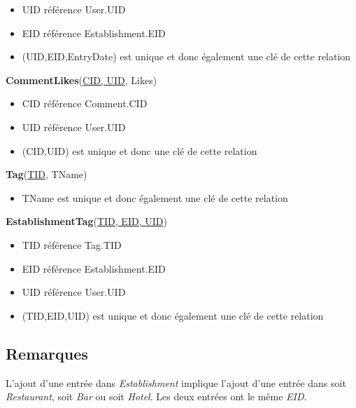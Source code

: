 \documentclass[11pt,a4paper]{report}
\begin{document}
\begin{itemize}
\item UID référence User.UID
\item EID référence Establishment.EID
\item (UID,EID,EntryDate) est unique et donc également une clé de cette relation\\
\end{itemize}
\textbf{CommentLikes}(\underline{CID, UID}, Likes)
\begin{itemize}
\item CID référence Comment.CID
\item UID référence User.UID
\item (CID,UID) est unique et donc une clé de cette relation\\
\end{itemize}
\textbf{Tag}(\underline{TID}, TName)
\begin{itemize}
\item TName est unique et donc également une clé de cette relation\\
\end{itemize}
\textbf{EstablishmentTag}(\underline{TID, EID, UID})
\begin{itemize}
\item TID référence Tag.TID
\item EID référence Establishment.EID
\item UID référence User.UID
\item (TID,EID,UID) est unique et donc également une clé de cette relation\\
\end{itemize}


\subsection*{Remarques}
L'ajout d'une entrée dans \textit{Establishment} implique l'ajout d'une entrée dans soit \textit{Restaurant}, soit \textit{Bar} ou soit \textit{Hotel}. Les deux entrées ont le même \textit{EID}.
\end{document}
